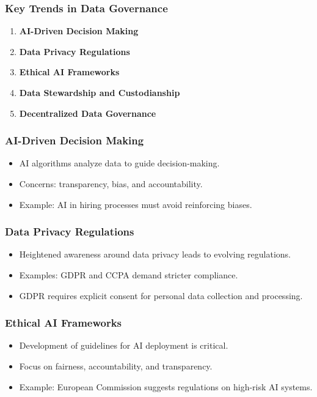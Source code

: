 \documentclass[aspectratio=169]{beamer}
\begin{document}
\begin{frame}[fragile]
    \frametitle{Key Trends in Data Governance}
    \begin{enumerate}
        \item \textbf{AI-Driven Decision Making}
        \item \textbf{Data Privacy Regulations}
        \item \textbf{Ethical AI Frameworks}
        \item \textbf{Data Stewardship and Custodianship}
        \item \textbf{Decentralized Data Governance}
    \end{enumerate}
\end{frame}

\begin{frame}[fragile]
    \frametitle{AI-Driven Decision Making}
    \begin{itemize}
        \item AI algorithms analyze data to guide decision-making.
        \item Concerns: transparency, bias, and accountability.
        \item Example: AI in hiring processes must avoid reinforcing biases.
    \end{itemize}
\end{frame}

\begin{frame}[fragile]
    \frametitle{Data Privacy Regulations}
    \begin{itemize}
        \item Heightened awareness around data privacy leads to evolving regulations.
        \item Examples: GDPR and CCPA demand stricter compliance.
        \item GDPR requires explicit consent for personal data collection and processing.
    \end{itemize}
\end{frame}

\begin{frame}[fragile]
    \frametitle{Ethical AI Frameworks}
    \begin{itemize}
        \item Development of guidelines for AI deployment is critical.
        \item Focus on fairness, accountability, and transparency.
        \item Example: European Commission suggests regulations on high-risk AI systems.
    \end{itemize}
\end{frame}
\end{document}
